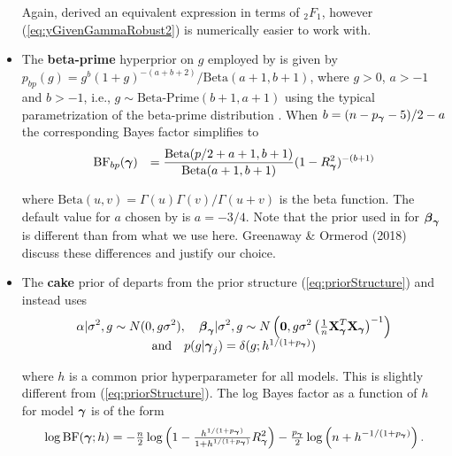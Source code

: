 \begin{itemize}
		\noindent Again, \cite{Bayarri2012} derived an equivalent expression in terms of ${}_2 F_1$, however
		(\ref{eq:yGivenGammaRobust2}) is numerically easier to work with.
 
		
	\item The {\bf beta-prime} hyperprior on $g$ employed by \cite{Maruyama2011} is given by
	$p_{bp}(g) = g^{b}(1 + g)^{-(a+b+2)}/\mbox{Beta}(a+1,b+1)$,
	where $g>0$, $a>-1$ and $b>-1$, i.e.,
	$g\sim \mbox{Beta-Prime}(b+1,a+1)$ using the typical parametrization of 
	the beta-prime distribution \citep{Johnson1995}. When	 $b = (n - p_{\boldsymbol \gamma} - 5)/2 - a$ 
	the corresponding Bayes factor simplifies to
	\begin{equation}\label{eq:marginalLikelihoodBetaPrime}
	\begin{array}{rl}
	\displaystyle \mbox{BF}_{bp}({\boldsymbol \gamma}) 
	& \displaystyle 
	=   
	\frac{\mbox{Beta}(p/2 + a + 1,b + 1)}{\mbox{Beta}(a+1,b+1)} (1-R_{\boldsymbol \gamma}^2)^{-(b + 1)}
	\end{array}
	\end{equation}	
	
	\noindent where $\mbox{Beta}(u,v) = \Gamma(u)\Gamma(v)/\Gamma(u+v)$ is the beta function.
	The default value for $a$ chosen by 
	\cite{Maruyama2011} is $a = -3/4$. Note that the prior used in \cite{Maruyama2011} for
	${\boldsymbol \beta}_{\boldsymbol \gamma}$ is different than from what we use here. Greenaway \& Ormerod (2018) discuss
	these differences and justify our choice.
	
	\item The {\bf cake} prior of \cite{OrmerodEtal2017} 
	departs from the prior structure (\ref{eq:priorStructure}) and instead uses
	\begin{equation}\label{eq:proirs2}
	\begin{array}{c}
	\displaystyle \alpha|\sigma^2,g \sim N(0,g\sigma^2), \quad 
	\displaystyle {\boldsymbol\beta}_{\boldsymbol \gamma}|\sigma^2,g \sim N\left( {\bf 0},g\sigma^2\left( \tfrac{1}{n}{\bf X}_{\boldsymbol \gamma}^T{\bf X}_{\boldsymbol \gamma}\right)^{-1}\right)
	\\ \mbox{and} \quad
	p(g|{\boldsymbol \gamma}_j) = \delta(g; h^{1/(1 + p_{\boldsymbol \gamma})})
	\end{array} 
	\end{equation}
	
	\noindent where $h$ is a common prior hyperparameter for all models. This is slightly
	different from (\ref{eq:priorStructure}). The log   Bayes factor
	as a function of $h$ 
	for model ${\boldsymbol \gamma}$ is of the form
	$$
	\begin{array}{rl}
	\displaystyle \log\mbox{BF}({\boldsymbol \gamma};h)
	=
	-\tfrac{n}{2}\log\left( 1 - \tfrac{h^{1/(1+p_{\boldsymbol \gamma})}}{1+h^{1/(1+p_{\boldsymbol \gamma})}} R_{\boldsymbol \gamma}^2 \right) 
	- \tfrac{p_{\boldsymbol \gamma}}{2}\log\left(n + h^{-1/(1+p_{\boldsymbol \gamma})} \right).
	\end{array}
	$$
	

\end{itemize}
